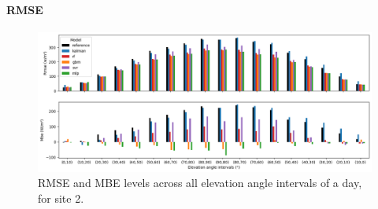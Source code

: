 \paragraph{RMSE}
\begin{figure}[htb!]
    \centering
    \includegraphics[width=\columnwidth]{figures/first_study/rmse_mbe_site2.png}
\caption{RMSE and MBE levels across all elevation angle intervals of a day, for site 2.}
\end{figure}

